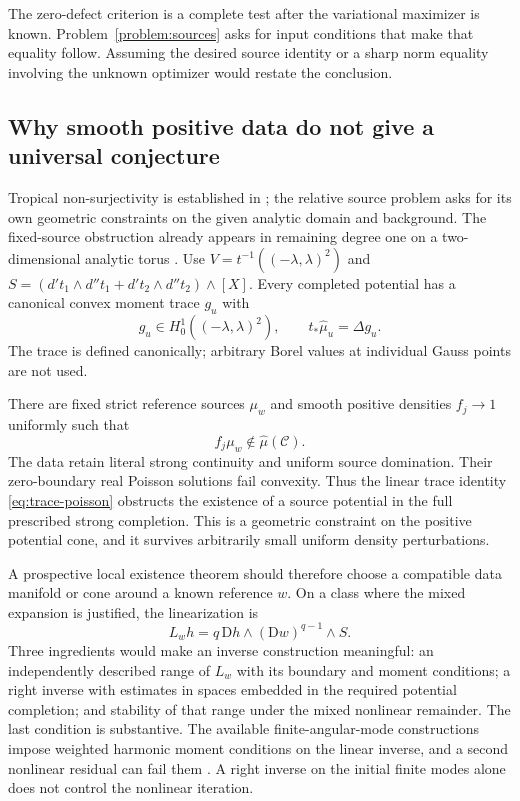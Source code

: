 \documentclass[11pt,a4paper]{article}
\newcommand{\MathEqref}[1]{{\hypersetup{linkcolor=EquationLink}\eqref{#1}}}
\newcommand{\Probref}[1]{Problem~\ref{#1}}
\theoremstyle{definition}
\theoremstyle{remark}
\numberwithin{equation}{section}
\newcommand{\D}{\mathrm D}
\newcommand{\C}{\mathscr C}
\begin{document}
The zero-defect criterion is a complete test after the variational
maximizer is known.  \Probref{problem:sources} asks for input
conditions that make that equality follow.  Assuming the desired
source identity or a sharp norm equality involving the unknown
optimizer would restate the conclusion.

\subsection{Why smooth positive data do not give a universal conjecture}

Tropical non-surjectivity is established in \cite{APW}; the relative
source problem asks for its own geometric constraints on the given
analytic domain and background.  The fixed-source obstruction already
appears in remaining degree one
on a two-dimensional analytic torus \cite{SourceObstruction}.  Use
$V=t^{-1}(( -\lambda,\lambda)^2)$ and
$S=(d't_1\wedge d''t_1+d't_2\wedge d''t_2)\wedge[X]$.
Every completed potential has a canonical convex moment trace $g_u$
with
\begin{equation}
          g_u\in H_0^1(( -\lambda,\lambda)^2),\qquad
                        t_*\widehat\mu_u=\Delta g_u.
                         \label{eq:trace-poisson}
\end{equation}
The trace is defined canonically; arbitrary Borel values at individual
Gauss points are not used.

There are fixed strict reference sources $\mu_w$ and smooth positive
densities $f_j\to1$ uniformly such that
\begin{equation}
                          f_j\mu_w\notin\widehat\mu(\C).
                         \label{eq:density-obstruction}
\end{equation}
The data retain literal strong continuity and uniform source domination.
Their zero-boundary real Poisson solutions fail convexity.  Thus the
linear trace identity \MathEqref{eq:trace-poisson} obstructs the
existence of a source potential in the full prescribed strong
completion.  This is a geometric constraint on the positive potential
cone, and it survives arbitrarily small uniform density perturbations.

A prospective local existence theorem should therefore choose a
compatible data manifold or cone around a known reference $w$.
On a class where the mixed expansion is justified, the linearization
is
\begin{equation}
              L_wh=q\,\D h\wedge(\D w)^{q-1}\wedge S.
                         \label{eq:linearization}
\end{equation}
Three ingredients would make an inverse construction meaningful:
an independently described range of $L_w$ with its boundary and
moment conditions; a right inverse with estimates in spaces embedded
in the required potential completion; and stability of that range
under the mixed nonlinear remainder.  The last condition is substantive.
The available finite-angular-mode constructions impose weighted
harmonic moment conditions on the linear inverse, and a second
nonlinear residual can fail them \cite{C2}.  A right inverse on the
initial finite modes alone does not control the nonlinear iteration.
\end{document}
